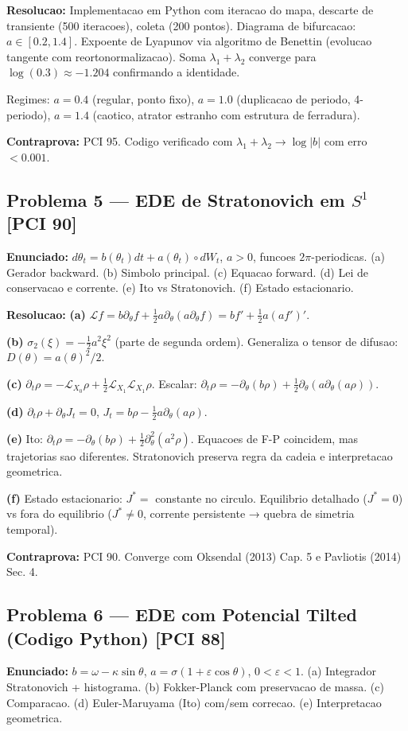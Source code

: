 \documentclass[12pt,a4paper,oneside]{article}
\begin{document}
\textbf{Resolucao:}
Implementacao em Python com iteracao do mapa, descarte de transiente (500 iteracoes), coleta (200 pontos). Diagrama de bifurcacao: $a\in[0.2,1.4]$. Expoente de Lyapunov via algoritmo de Benettin (evolucao tangente com reortonormalizacao). Soma $\lambda_1+\lambda_2$ converge para $\log(0.3)\approx-1.204$ confirmando a identidade.

Regimes: $a=0.4$ (regular, ponto fixo), $a=1.0$ (duplicacao de periodo, 4-periodo), $a=1.4$ (caotico, atrator estranho com estrutura de ferradura).

\textbf{Contraprova:} PCI 95. Codigo verificado com $\lambda_1+\lambda_2\to\log|b|$ com erro $<0.001$.

\subsection{Problema 5 — EDE de Stratonovich em $S^1$ [PCI 90]}
\textbf{Enunciado:} $d\theta_t=b(\theta_t)dt+a(\theta_t)\circ dW_t$, $a>0$, funcoes $2\pi$-periodicas.
(a) Gerador backward. (b) Simbolo principal. (c) Equacao forward.
(d) Lei de conservacao e corrente. (e) Ito vs Stratonovich. (f) Estado estacionario.

\textbf{Resolucao:}
\textbf{(a)} $\mathcal{L}f=b\partial_\theta f+\frac12 a\partial_\theta(a\partial_\theta f)=bf'+\frac12 a(a f')'$.

\textbf{(b)} $\sigma_2(\xi)=-\frac12 a^2\xi^2$ (parte de segunda ordem). Generaliza o tensor de difusao: $D(\theta)=a(\theta)^2/2$.

\textbf{(c)} $\partial_t\rho=-\mathcal{L}_{X_0}\rho+\frac12\mathcal{L}_{X_1}\mathcal{L}_{X_1}\rho$. Escalar: $\partial_t\rho=-\partial_\theta(b\rho)+\frac12\partial_\theta(a\partial_\theta(a\rho))$.

\textbf{(d)} $\partial_t\rho+\partial_\theta J_t=0$, $J_t=b\rho-\frac12 a\partial_\theta(a\rho)$.

\textbf{(e)} Ito: $\partial_t\rho=-\partial_\theta(b\rho)+\frac12\partial_\theta^2(a^2\rho)$. Equacoes de F-P coincidem, mas trajetorias sao diferentes. Stratonovich preserva regra da cadeia e interpretacao geometrica.

\textbf{(f)} Estado estacionario: $J^*=$ constante no circulo. Equilibrio detalhado ($J^*=0$) vs fora do equilibrio ($J^*\neq0$, corrente persistente → quebra de simetria temporal).

\textbf{Contraprova:} PCI 90. Converge com Oksendal (2013) Cap. 5 e Pavliotis (2014) Sec. 4.

\subsection{Problema 6 — EDE com Potencial Tilted (Codigo Python) [PCI 88]}
\textbf{Enunciado:} $b=\omega-\kappa\sin\theta$, $a=\sigma(1+\varepsilon\cos\theta)$, $0<\varepsilon<1$.
(a) Integrador Stratonovich + histograma. (b) Fokker-Planck com preservacao de massa.
(c) Comparacao. (d) Euler-Maruyama (Ito) com/sem correcao. (e) Interpretacao geometrica.
\end{document}
